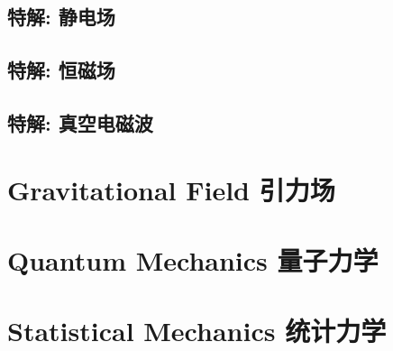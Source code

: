 \documentclass{article}
\begin{document}
\subsection{特解: 静电场}


\subsection{特解: 恒磁场}


\subsection{特解: 真空电磁波}




\section{Gravitational Field 引力场}



\section{Quantum Mechanics 量子力学}



\section{Statistical Mechanics 统计力学}
\end{document}
